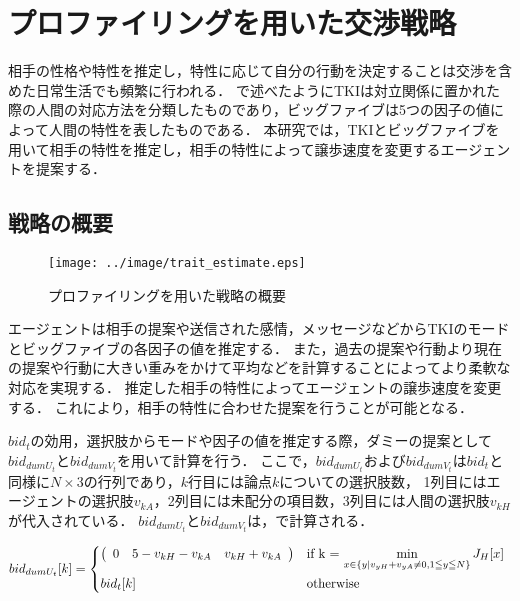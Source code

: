 

\chapter{プロファイリングを用いた交渉戦略}
相手の性格や特性を推定し，特性に応じて自分の行動を決定することは交渉を含めた日常生活でも頻繁に行われる．
で述べたようにTKIは対立関係に置かれた際の人間の対応方法を分類したものであり，ビッグファイブは5つの因子の値によって人間の特性を表したものである．
本研究では，TKIとビッグファイブを用いて相手の特性を推定し，相手の特性によって譲歩速度を変更するエージェントを提案する．

\section{戦略の概要}
\begin{figure}[tb]
    \centering
    \texttt{[image: ../image/trait\_estimate.eps]}
    \caption{プロファイリングを用いた戦略の概要}
    \label{fig:trait_estimate}
\end{figure}
エージェントは相手の提案や送信された感情，メッセージなどからTKIのモードとビッグファイブの各因子の値を推定する．
また，過去の提案や行動より現在の提案や行動に大きい重みをかけて平均などを計算することによってより柔軟な対応を実現する．
推定した相手の特性によってエージェントの譲歩速度を変更する．
これにより，相手の特性に合わせた提案を行うことが可能となる．

$bid_t$の効用，選択肢からモードや因子の値を推定する際，ダミーの提案として$bid_{dumU_t}$と$bid_{dumV_t}$を用いて計算を行う．
ここで，$bid_{dumU_t}$および$bid_{dumV_t}$は$bid_t$と同様に$N \times 3$の行列であり，$k$行目には論点$k$についての選択肢数，
1列目にはエージェントの選択肢$v_{kA}$，2列目には未配分の項目数，3列目には人間の選択肢$v_{kH}$が代入されている．
$bid_{dumU_t}$と$bid_{dumV_t}$は，で計算される．

\begin{equation}
    bid_{dumU_t}[k] = 
    \begin{cases*}
        \left(
    \begin{array}{rrr}
        0 & 5 - v_{kH} - v_{kA} & v_{kH} + v_{kA}
    \end{array}
    \right) & if k = $\displaystyle \min_{x \in \{y | v_{yH} + v_{yA} \neq 0, 1 \leqq y \leqq N \} } J_H[x]$ \\
        bid_t[k] & otherwise
    \end{cases*}
    \label{eq:dummyutil}
\end{equation}

